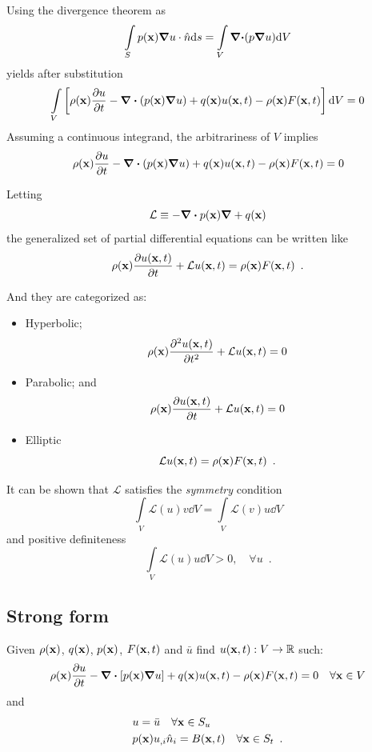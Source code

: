 Using the divergence theorem as
\[\int\limits_S p(\vb x) \grad u \cdot \hat n \dd s  = \int\limits_V \vb \div  (p\vb \grad u)\dd V\]
yields after substitution
\[\int\limits_V \left[\rho (\vb x)\pdv{u}{t} - \div (p(\vb x)\grad u) + q(\vb x)u(\vb x, t) - \rho (\vb x)F(\vb x, t)\right]\dd V  = 0\]
Assuming a continuous integrand, the arbitrariness of $V$ implies
\[\rho (\vb x)\pdv{u}{t} - \div(p(\vb x)\grad u) + q(\vb x)u(\vb x, t) - \rho (\vb x)F(\vb x, t) = 0\]

Letting
\[\mathcal{L} \equiv  - \div p(\vb x)\grad + q(\vb x)\]
the generalized set of partial differential equations can be written like
\begin{equation}
\rho(\vb x) \pdv{u(\vb x, t)}{t} + \mathcal{L}u(\vb x, t) = \rho (\vb x)F(\vb x, t) \enspace .
\label{eq:GenPDE}
\end{equation}

And they are categorized as:
\begin{itemize}
    \item Hyperbolic;
    \[\rho(\vb x) \pdv[2]{u(\vb x, t)}{t} + \mathcal{L}u(\vb x,t) = 0\]

    \item Parabolic; and
    \[\rho(\vb x) \pdv{u(\vb x,t)}{t} + \mathcal{L}u(\vb x, t) = 0\]

    \item Elliptic
    \[\mathcal{L}u(\vb x, t) = \rho (\vb x)F(\vb x, t) \enspace .\]
\end{itemize}

It can be shown that $\mathcal{L}$ satisfies the \emph{symmetry} condition
\[\int\limits_V \mathcal{L}(u)v\dd V =  \int\limits_V \mathcal{L}(v)u \dd V\]
and positive definiteness \cite{book:sepulveda_fismat, book:arfken}
\[\int\limits_V \mathcal{L}(u)u\dd V  > 0, \quad \forall u \enspace .\]

\subsection*{Strong form}
Given $\rho(\vb x)$, $q(\vb x)$, $p(\vb x)$, $F(\vb x, t)$ and $\bar u$ find $u(\vb x , t):V \to \mathbb{R}$ such:
\[\rho(\vb x) \pdv{u}{t} - \div \left[p(\vb x) \grad u\right] + q(\vb x) u(\vb x, t) - \rho(\vb x) F(\vb x, t) = 0 \quad \forall \vb x \in V \]
and
\begin{align*}
    &u = \bar u \quad \forall \vb x \in S_u\\
    &p(\vb x)u_{,i} \hat n_i= B(\vb x,t)\quad \forall \vb x \in  S_t \enspace .
\end{align*}



